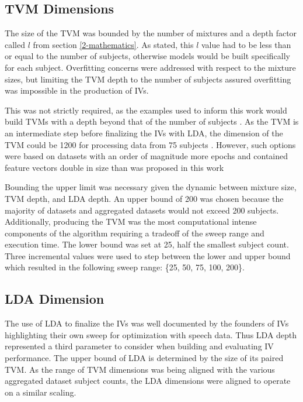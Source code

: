 \subsection{TVM Dimensions}

The size of the \ac{TVM} was bounded by the number of mixtures and a depth factor called $l$ from section \ref{2-mathematics}. As stated, this $l$ value had to be less than or equal to the number of subjects, otherwise models would be built specifically for each subject. Overfitting concerns were addressed with respect to the mixture sizes, but limiting the \ac{TVM} depth to the number of subjects assured overfitting was impossible in the production of \acp{IV}.

This was not strictly required, as the examples used to inform this work would build \acp{TVM} with a depth beyond that of the number of subjects \cite{Dehak2011}. As the \ac{TVM} is an intermediate step before finalizing the \acp{IV} with \ac{LDA}, the dimension of the \ac{TVM} could be 1200 for processing data from 75 subjects \cite{McLaren2011}. However, such options were based on datasets with an order of magnitude more epochs and contained feature vectors double in size than was proposed in this work

Bounding the upper limit was necessary given the dynamic between mixture size, \ac{TVM} depth, and \ac{LDA} depth. An upper bound of 200 was chosen because the majority of datasets and aggregated datasets would not exceed 200 subjects. Additionally, producing the \ac{TVM} was the most computational intense components of the algorithm requiring a tradeoff of the sweep range and execution time. The lower bound was set at 25, half the smallest subject count. Three incremental values were used to step between the lower and upper bound which resulted in the following sweep range: \{25, 50, 75, 100, 200\}.

\subsection{LDA Dimension}

The use of \ac{LDA} to finalize the \acp{IV} was well documented by the founders of \acp{IV} \cite{Dehak2011a,Dehak2011} highlighting their own sweep for optimization with speech data. Thus \ac{LDA} depth represented a third parameter to consider when building and evaluating \ac{IV} performance. The upper bound of \ac{LDA} is determined by the size of its paired \ac{TVM}. As the range of \ac{TVM} dimensions was being aligned with the various aggregated dataset subject counts, the \ac{LDA} dimensions were aligned to operate on a similar scaling.

